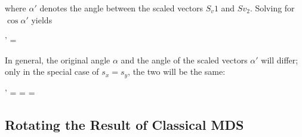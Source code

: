 where $\alpha'$ denotes the angle between the scaled vectors $S_v1$ and $Sv_2$. Solving for $\cos \alpha'$ yields

\bee
\cos \alpha' = 
\eee

In general, the original angle $\alpha$ and the angle of the scaled vectors $\alpha'$ will differ; only in the special case of $s_x=s_y$, the two will be the same:

\bee
\cos \alpha' =  = \frac{\cos \alpha}{\sqrt{\cos^2 \alpha + \sin^2 \alpha}} = \cos \alpha
\eee


\subsection{Rotating the Result of Classical MDS}


